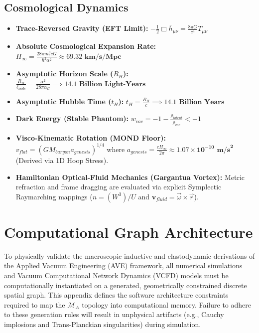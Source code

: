 \section{Cosmological Dynamics}
\begin{itemize}
    \item \textbf{Trace-Reversed Gravity (EFT Limit):} $-\frac{1}{2} \Box \bar{h}_{\mu\nu} = \frac{8\pi G}{c^4} T_{\mu\nu}$
    \item \textbf{Absolute Cosmological Expansion Rate:} $H_\infty = \frac{28\pi m_e^3 c G}{\hbar^2 \alpha^2} \approx \mathbf{69.32 \text{ km/s/Mpc}}$
    \item \textbf{Asymptotic Horizon Scale ($R_H$):} $\frac{R_H}{\ell_{node}} = \frac{\alpha^2}{28\pi\alpha_G} \implies \mathbf{14.1 \text{ Billion Light-Years}}$
    \item \textbf{Asymptotic Hubble Time ($t_H$):} $t_H = \frac{R_H}{c} \implies \mathbf{14.1 \text{ Billion Years}}$
    \item \textbf{Dark Energy (Stable Phantom):} $w_{vac} = -1 - \frac{\rho_{latent}}{\rho_{vac}} < -1$
    \item \textbf{Visco-Kinematic Rotation (MOND Floor):} $v_{flat} = (GM_{baryon} a_{genesis})^{1/4}$ where $a_{genesis} = \frac{c H_\infty}{2\pi} \approx \mathbf{1.07 \times 10^{-10} \text{ m/s}^2}$ (Derived via 1D Hoop Stress).
    \item \textbf{Hamiltonian Optical-Fluid Mechanics (Gargantua Vortex):} Metric refraction and frame dragging are evaluated via explicit Symplectic Raymarching mappings ($n = (W^3) / U$ and $\mathbf{v}_{fluid} = \vec{\omega} \times \vec{r}$). 
\end{itemize}

\chapter{Computational Graph Architecture}
\label{app:computational_graph}

To physically validate the macroscopic inductive and elastodynamic derivations of the Applied Vacuum Engineering (AVE) framework, all numerical simulations and Vacuum Computational Network Dynamics (VCFD) models must be computationally instantiated on a generated, geometrically constrained discrete spatial graph. This appendix defines the software architecture constraints required to map the $\mathcal{M}_A$ topology into computational memory. Failure to adhere to these generation rules will result in unphysical artifacts (e.g., Cauchy implosions and Trans-Planckian singularities) during simulation.

